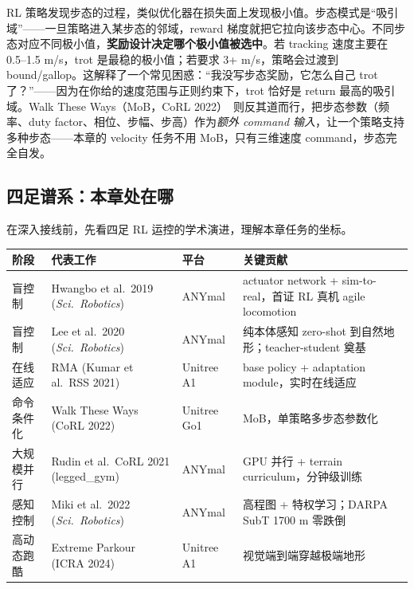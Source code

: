 \begin{insight}[步态涌现 = 优化器在损失面上落入吸引域]\label{ins:rlmc-ql-attractor}
RL 策略发现步态的过程，类似优化器在损失面上发现极小值。步态模式是“吸引域”——一旦策略进入某步态的邻域，reward 梯度就把它拉向该步态中心。不同步态对应不同极小值，\textbf{奖励设计决定哪个极小值被选中}。若 tracking 速度主要在 0.5--1.5 m/s，trot 是最稳的极小值；若要求 3+ m/s，策略会过渡到 bound/gallop。这解释了一个常见困惑：“我没写步态奖励，它怎么自己 trot 了？”——因为在你给的速度范围与正则约束下，trot 恰好是 return 最高的吸引域。Walk These Ways（MoB，CoRL 2022）\,\cite{margolis2022walk} 则反其道而行，把步态参数（频率、duty factor、相位、步幅、步高）作为\emph{额外 command 输入}，让一个策略支持多种步态——本章的 velocity 任务不用 MoB，只有三维速度 command，步态完全自发。
\end{insight}

\subsection{四足谱系：本章处在哪}
\label{sec:rlmc-ql-history}

在深入接线前，先看四足 RL 运控的学术演进，理解本章任务的坐标。

\begin{center}
\small
\begin{tabular}{@{}lllp{4.3cm}@{}}
\toprule
阶段 & 代表工作 & 平台 & 关键贡献 \\
\midrule
盲控制 & Hwangbo et al.\ 2019 (\textit{Sci.\ Robotics}) & ANYmal & actuator network + sim-to-real，首证 RL 真机 agile locomotion \\
盲控制 & Lee et al.\ 2020 (\textit{Sci.\ Robotics})\,\cite{lee2020quadruped} & ANYmal & 纯本体感知 zero-shot 到自然地形；teacher-student 奠基 \\
在线适应 & RMA (Kumar et al.\ RSS 2021)\,\cite{kumar2021rma} & Unitree A1 & base policy + adaptation module，实时在线适应 \\
命令条件化 & Walk These Ways (CoRL 2022)\,\cite{margolis2022walk} & Unitree Go1 & MoB，单策略多步态参数化 \\
大规模并行 & Rudin et al.\ CoRL 2021 (legged\_gym)\,\cite{rudin2021minutes} & ANYmal & GPU 并行 + terrain curriculum，分钟级训练 \\
感知控制 & Miki et al.\ 2022 (\textit{Sci.\ Robotics})\,\cite{miki2022perceptive} & ANYmal & 高程图 + 特权学习；DARPA SubT 1700 m 零跌倒 \\
高动态跑酷 & Extreme Parkour (ICRA 2024)\,\cite{cheng2024parkour} & Unitree A1 & 视觉端到端穿越极端地形 \\
\bottomrule
\end{tabular}
\end{center}

